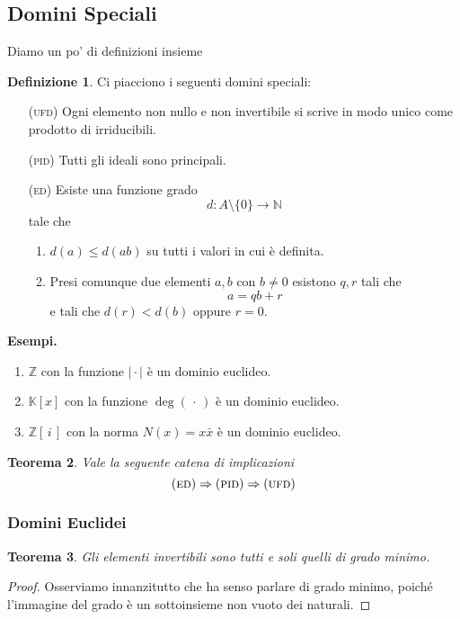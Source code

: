 \documentclass[a4paper]{article}
\newtheorem{theorem}{Teorema}[section]
\theoremstyle{remark}
\theoremstyle{definition}
\newtheorem{definition}[theorem]{Definizione}
\newcommand{\Z}{\mathbb{Z}}
\newcommand{\K}{\mathbb{K}}
\begin{document}
\subsection{Domini Speciali}
\begin{multicols}{2}
	Diamo un po' di definizioni insieme
	\begin{definition}
		Ci piacciono i seguenti domini speciali:
		\begin{itemize}
			\item [(\textsc{ufd})] Ogni elemento non nullo e non invertibile si scrive in modo unico come prodotto di irriducibili.
			
			\item [(\textsc{pid})] Tutti gli ideali sono principali.
			
			\item [(\textsc{ed})] Esiste una funzione grado \[{d}:{A\setminus\{0\}}\to{\mathbb{N}}\]
			tale che 
			\begin{enumerate}
				\item $ d(a) \leq d(ab) $ su tutti i valori in cui è definita.
				\item Presi comunque due elementi $ a, b $ con $ b \neq 0 $ esistono $ q, r $ tali che
				\[ a = qb + r \]
				e tali che $ d(r) < d(b) $ oppure $ r = 0 $.
			\end{enumerate}
			
		\end{itemize}
	\end{definition}

\textbf{Esempi.}
\begin{enumerate}
	\item $ \Z $ con la funzione $ \mid \cdot\mid $ è un dominio euclideo.
	\item $ \K[x] $ con la funzione $ \deg(\,\cdot\,) $ è un dominio euclideo.
	\item $ \Z[\,i\,] $ con la norma $ N(x) = x\bar{x} $ è un dominio euclideo.
\end{enumerate}

\begin{theorem}
	Vale la seguente catena di implicazioni
	\[ (\textsc{ed})\Rightarrow(\textsc{pid})\Rightarrow(\textsc{ufd}) \]
\end{theorem}
	
\subsubsection{Domini Euclidei}

\begin{theorem}
	Gli elementi invertibili sono tutti e soli quelli di grado minimo.
\end{theorem}
\begin{proof}
	Osserviamo innanzitutto che ha senso parlare di grado minimo, poiché l'immagine del grado è un sottoinsieme non vuoto dei naturali.
	

\end{proof}
\end{multicols}
\end{document}
